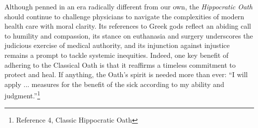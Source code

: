 \documentclass[12pt]{article}
\begin{document}
\bigskip

Although penned in an era radically different from our own, the \textit{Hippocratic Oath} should continue to challenge 
physicians to navigate the complexities of modern health care with moral clarity. 
Its references to Greek gods reflect an abiding call to humility and compassion, its stance on euthanasia and surgery underscores the 
judicious exercise of medical authority, and its injunction against injustice remains a prompt to tackle systemic inequities. 
Indeed, one key benefit of adhering to the Classical Oath is that it reaffirms a timeless commitment 
to protect and heal. 
If anything, the Oath’s spirit is needed more than ever: “I will apply ... measures for the benefit of the sick according to my ability and judgment.”\footnote{Reference 4, Classic Hippocratic Oath}

\bigskip
\end{document}
